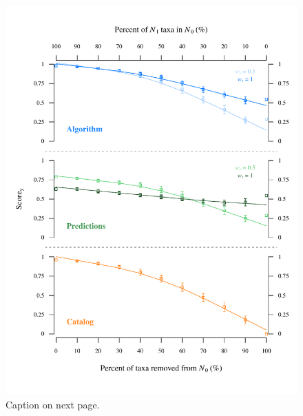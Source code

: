 \documentclass[letterpaper]{article}
\begin{document}
\newpage
    \begin{figure}[h]
      \centering\includegraphics[width=\textwidth]{catalog_predictions2.pdf}
      \caption{Caption on next page.}
      \label{fig:catalog_pred}
    \end{figure}
    \newpage
\end{document}
